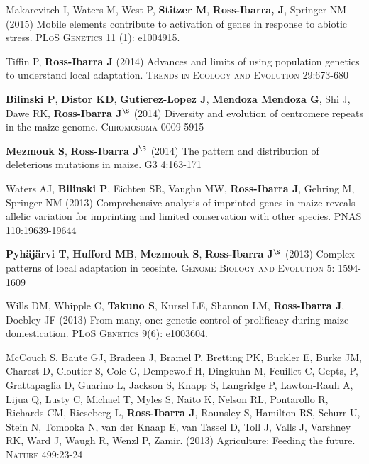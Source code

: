 \documentclass[letterpaper,10pt]{article}
\begin{document}
\begin{etaremune}
\item Makarevitch I, Waters M, West P, {\bf Stitzer M}, {\bf Ross-Ibarra, J}, Springer NM (2015) Mobile elements contribute to activation of genes in response to abiotic stress. \textsc{PLoS Genetics} 11 (1): e1004915. %


\item Tiffin P, {\bf Ross-Ibarra J} (2014) Advances and limits of using population genetics to understand local adaptation. \textsc{Trends in Ecology and Evolution} 29:673-680 %


\item {\bf Bilinski P}, {\bf Distor KD}, {\bf Gutierez-Lopez J}, {\bf Mendoza Mendoza G}, Shi J, Dawe RK,  {\bf Ross-Ibarra J}$^\S$ (2014) Diversity and evolution of centromere repeats in the maize genome. \textsc{Chromosoma} 0009-5915

\item {\bf Mezmouk S}, {\bf Ross-Ibarra J}$^\S$ (2014) The pattern and distribution of deleterious mutations in maize. \textsc{G3} 4:163-171

\item Waters AJ, {\bf Bilinski P}, Eichten SR, Vaughn MW, {\bf Ross-Ibarra J}, Gehring M, Springer NM (2013) Comprehensive analysis of imprinted genes in maize reveals allelic variation for imprinting and limited conservation with other species. \textsc{PNAS} 110:19639-19644


\item {\bf Pyh\"aj\"arvi T}, {\bf Hufford MB}, {\bf Mezmouk S}, {\bf Ross-Ibarra J}$^\S$ (2013) Complex patterns of local adaptation in teosinte. \textsc{Genome Biology and Evolution} 5: 1594-1609 %


\item Wills DM, Whipple C, {\bf Takuno S}, Kursel LE, Shannon LM, {\bf Ross-Ibarra J}, Doebley JF (2013) From many, one: genetic control of prolificacy during maize domestication. \textsc{PLoS Genetics} 9(6): e1003604. %

\item McCouch S, Baute GJ, Bradeen J, Bramel P, Bretting PK, Buckler E, Burke JM, Charest D, Cloutier S, Cole G, Dempewolf H, Dingkuhn M, Feuillet C, Gepts, P, Grattapaglia D, Guarino L, Jackson S, Knapp S, Langridge P, Lawton-Rauh A, Lijua Q, Lusty C, Michael T, Myles S, Naito K, Nelson RL, Pontarollo R, Richards CM, Rieseberg L, {\bf Ross-Ibarra J}, Rounsley S, Hamilton RS, Schurr U, Stein N, Tomooka N, van der Knaap E, van Tassel D, Toll J, Valls J, Varshney RK, Ward J, Waugh R, Wenzl P, Zamir. (2013) Agriculture: Feeding the future. \textsc{Nature} 499:23-24


\end{etaremune}
\end{document}

